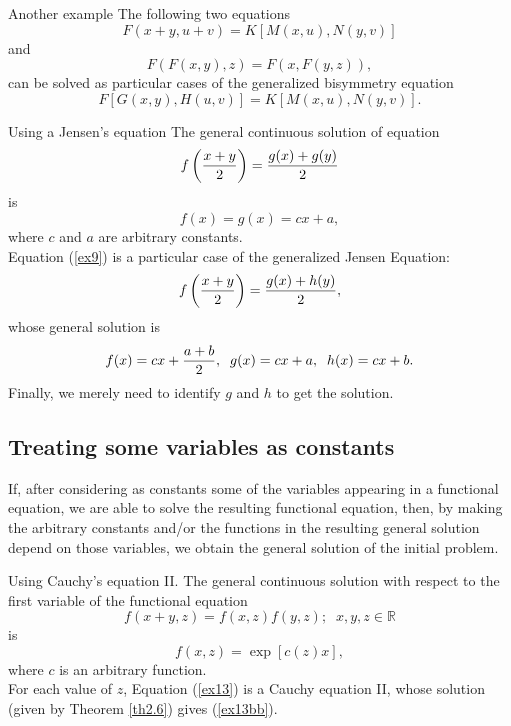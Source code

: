 \documentclass[
	11pt, %
	fleqn, %
	a4paper, %
]{LegrandOrangeBook}
\newcommand{\R}{\mathbb{R}}
\begin{document}
\begin{example}{Another example}
The following two equations
$$F(x+y,u+v)=K[M(x,u),N(y,v)]$$
and
$$F(F(x,y),z)=F(x,F(y,z)),$$
can be solved as particular cases of the generalized bisymmetry equation
\begin{displaymath}
F[G(x,y),H(u,v)]=K[M(x,u),N(y,v)].
\end{displaymath}
\end{example}

\begin{example}{Using a Jensen's equation}
The general continuous solution of equation
\begin{equation}\label{ex9}
f\left({{x+y}\over 2}\right)={{g(x)+g(y)}\over 2}
\end{equation}
is
\begin{displaymath}
f(x)=g(x)=cx+a,
\end{displaymath}
where $c$ and $a$ are arbitrary constants.\\

 Equation (\ref{ex9}) is a particular case
of the generalized Jensen Equation:
\begin{displaymath}
f\left({{x+y}\over 2}\right)={{g(x)+h(y)}\over 2},
\end{displaymath}
whose general solution is
\begin{displaymath}
f(x)=cx+{{a+b}\over 2},\;\;g(x)=cx+a ,\;\;h(x)=cx+b.
\end{displaymath}
Finally, we merely need to identify $g$ and $h$ to get the
solution.
\end{example}

\subsection{Treating some variables as constants}\label{s2.6}
If, after considering as constants some of the variables appearing
in a functional equation, we are able to solve the resulting
functional equation, then, by making the arbitrary constants
and/or the functions in the resulting general solution depend on
those variables, we obtain the general solution of the initial
problem.

\begin{example}{Using Cauchy's equation II. }
The general continuous solution with respect to the first variable of the functional equation
\begin{equation}\label{ex13} f(x+y,z)=f(x,z)f(y,z);\;\;x,y,z\in \R
\end{equation}
is
\begin{equation}\label{ex13bb}
f(x,z)=\exp[c(z)x],
\end{equation}
where $c$ is an arbitrary function.\\

 For each value of $z$, Equation
(\ref{ex13}) is a Cauchy equation II, whose solution (given by
Theorem \ref{th2.6}) gives (\ref{ex13bb}).
\end{example}
\end{document}

